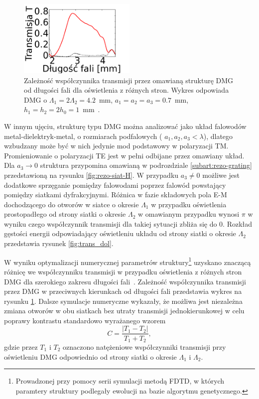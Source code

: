 \begin{figure}
	\centering
	\includegraphics[width=0.5\textwidth]{images/thz/opt_lett_spect.png}
	\caption{Zależność współczynnika transmisji przez omawianą strukturę DMG od długości fali dla oświetlenia z różnych stron. Wykres odpowiada DMG o $\Lambda_1= 2 \Lambda_2 = 4.2$~mm, $a_1=a_2=a_3=0.7$~mm, $h_1=h_2=2 h_0=1$~mm~\cite{Stolarek:13}.}
	\label{fig:trans_freq}
\end{figure}

 W innym ujęciu, strukturę typu DMG można analizować jako układ falowodów metal-dielektryk-metal, o rozmiarach podfalowych ( $a_1,a_2,a_3 < \lambda$), dlatego wzbudzany może być w nich jedynie mod podstawowy w polaryzacji TM. Promieniowanie o polaryzacji TE jest w pełni odbijane przez omawiany układ. Dla $a_3 \to 0$ struktura przypomina omawianą w podrozdziale \ref{subart:rezo-grating} przedstawioną na rysunku \ref{fig:rezo-siat-H}. W przypadku $a_3 \ne 0$ możliwe jest dodatkowe sprzęganie pomiędzy falowodami poprzez falowód powstający pomiędzy siatkami dyfrakcyjnymi. Różnica w fazie składowych pola E-M dochodzącego do otworów w siatce o okresie $\Lambda_1$ w przypadku oświetlenia prostopadłego od strony siatki o okresie $\Lambda_2$ w omawianym przypadku wynosi $\pi$ w wyniku czego współczynnik transmisji dla takiej sytuacji zbliża się do 0. Rozkład gęstości energii odpowiadający oświetleniu układu od strony siatki o okresie $\Lambda_2$ przedstawia rysunek \ref{fig:trans_dol}.

W wyniku optymalizacji numerycznej parametrów struktury\footnote{Prowadzonej przy pomocy serii symulacji metodą FDTD, w których paramtery struktury podlegały ewolucji na bazie algorytmu genetycznego.} uzyskano znaczącą różnicę we współczynniku transmisji w przypadku oświetlenia z różnych stron DMG dla szerokiego zakresu długości fali~\cite{Stolarek:13}. Zależność współczynnika transmisji przez DMG w przeciwnych kierunkach od długości fali przedstawia wykres na rysunku \ref{fig:trans_freq}. Dalsze symulacje numeryczne wykazały, że możliwa jest niezależna zmiana otworów w obu siatkach bez utraty transmisji jednokierunkowej w celu poprawy kontrastu standardowo wyrażanego wzorem
\begin{equation}
C=\frac{|T_1 - T_2|}{T_1+T_2},
\label{eq:contrast}
\end{equation}
gdzie przez $T_1$ i $T_2$ oznaczono natężeniowe współczynniki transmisji przy oświetleniu DMG odpowiednio od strony siatki o okresie $\Lambda_1$ i $\Lambda_2$.

